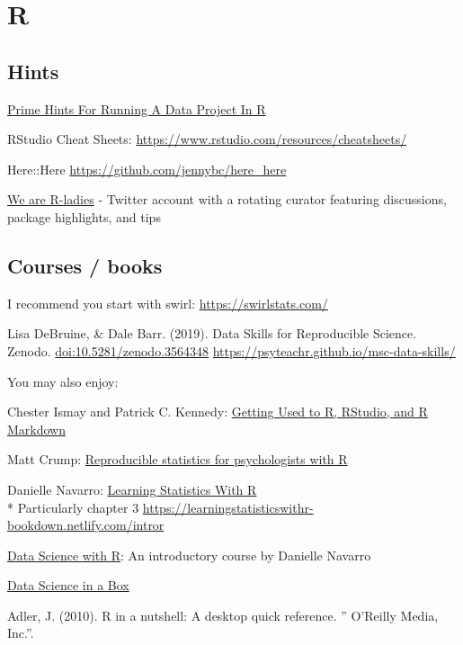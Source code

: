 \documentclass[
]{book}
\begin{document}
\hypertarget{r}{%
\section{R}\label{r}}

\hypertarget{hints}{%
\subsection{Hints}\label{hints}}

\href{https://kkulma.github.io/2018-03-18-Prime-Hints-for-Running-a-data-project-in-R/}{Prime Hints For Running A Data Project In R}

RStudio Cheat Sheets: \url{https://www.rstudio.com/resources/cheatsheets/}

Here::Here \url{https://github.com/jennybc/here_here}

\href{https://twitter.com/WeAreRLadies}{We are R-ladies} - Twitter account with a rotating curator featuring discussions, package highlights, and tips

\hypertarget{courses-books}{%
\subsection{Courses / books}\label{courses-books}}

I recommend you start with swirl: \url{https://swirlstats.com/}

Lisa DeBruine, \& Dale Barr. (2019). Data Skills for Reproducible Science. Zenodo. \url{doi:10.5281/zenodo.3564348} \url{https://psyteachr.github.io/msc-data-skills/}

You may also enjoy:

Chester Ismay and Patrick C. Kennedy: \href{https://rbasics.netlify.com/}{Getting Used to R, RStudio, and R Markdown}

Matt Crump: \href{https://crumplab.github.io/rstatsforpsych/}{Reproducible statistics for psychologists with R}

Danielle Navarro: \href{https://learningstatisticswithr.com/}{Learning Statistics With R}\\
* Particularly chapter 3 \url{https://learningstatisticswithr-bookdown.netlify.com/intror}

\href{http://robust-tools.djnavarro.net/}{Data Science with R}: An introductory course by Danielle Navarro

\href{https://datasciencebox.org/?s=03}{Data Science in a Box}

Adler, J. (2010). R in a nutshell: A desktop quick reference. '' O'Reilly Media, Inc.''.
\end{document}
